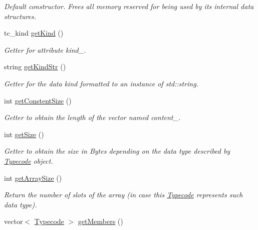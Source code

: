 \begin{DoxyCompactItemize}
\begin{DoxyCompactList}\small\item\em Default constructor. Frees all memory reserved for being used by its internal data structures. \end{DoxyCompactList}\item 
tc\-\_\-kind \hyperlink{class_dynamic_fast_buffers_1_1_typecode_ab40fde2f43949500cf6184def44543ff}{get\-Kind} ()
\begin{DoxyCompactList}\small\item\em Getter for attribute kind\-\_\-. \end{DoxyCompactList}\item 
string \hyperlink{class_dynamic_fast_buffers_1_1_typecode_ac21073692c570dc53e5ee94ed1d8371c}{get\-Kind\-Str} ()
\begin{DoxyCompactList}\small\item\em Getter for the data kind formatted to an instance of std\-::string. \end{DoxyCompactList}\item 
int \hyperlink{class_dynamic_fast_buffers_1_1_typecode_a4b5ba40d4ad8eb5cc0575b3590437632}{get\-Constent\-Size} ()
\begin{DoxyCompactList}\small\item\em Getter to obtain the length of the vector named content\-\_\-. \end{DoxyCompactList}\item 
int \hyperlink{class_dynamic_fast_buffers_1_1_typecode_af19773d89c4bd3b7bd3a120700969143}{get\-Size} ()
\begin{DoxyCompactList}\small\item\em Getter to obtain the size in Bytes depending on the data type described by \hyperlink{class_dynamic_fast_buffers_1_1_typecode}{Typecode} object. \end{DoxyCompactList}\item 
int \hyperlink{class_dynamic_fast_buffers_1_1_typecode_af0e9c820660aa3307f20867533a7d3f3}{get\-Array\-Size} ()
\begin{DoxyCompactList}\small\item\em Return the number of slots of the array (in case this \hyperlink{class_dynamic_fast_buffers_1_1_typecode}{Typecode} represents such data type). \end{DoxyCompactList}\item 
vector$<$ \hyperlink{class_dynamic_fast_buffers_1_1_typecode}{Typecode} $>$ \hyperlink{class_dynamic_fast_buffers_1_1_typecode_a228bdb668d7a72e176b9a34fafb2c912}{get\-Members} ()

\end{DoxyCompactItemize}
